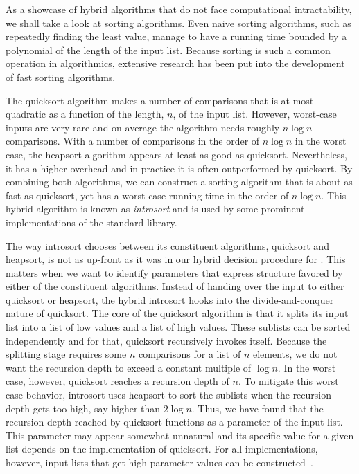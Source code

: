 \begin{example}
  As a showcase of hybrid algorithms that do not face computational intractability, we shall take a look at sorting algorithms.
  Even naive sorting algorithms, such as repeatedly finding the least value, manage to have a running time bounded by a polynomial of the length of the input list.
  Because sorting is such a common operation in algorithmics, extensive research has been put into the development of fast sorting algorithms.

  The quicksort algorithm \parencite{cormen2009introduction} makes a number of comparisons that is at most quadratic as a function of the length, $n$, of the input list.
  However, worst-case inputs are very rare and on average the algorithm needs roughly $n \log n$ comparisons.
  With a number of comparisons in the order of $n \log n$ in the worst case, the heapsort algorithm \parencite{cormen2009introduction} appears at least as good as quicksort.
  Nevertheless, it has a higher overhead and in practice it is often outperformed by quicksort.
  By combining both algorithms, we can construct a sorting algorithm that is about as fast as quicksort, yet has a worst-case running time in the order of $n \log n$.
  This hybrid algorithm is known as \emph{introsort} \parencite{musser1997introspective} and is used by some prominent implementations of the \Cpp{} standard library.

  The way introsort chooses between its constituent algorithms, quicksort and heapsort, is not as up-front as it was in our hybrid decision procedure for .
  This matters when we want to identify parameters that express structure favored by either of the constituent algorithms.
  Instead of handing over the input to either quicksort or heapsort, the hybrid introsort hooks into the divide-and-conquer nature of quicksort.
  The core of the quicksort algorithm is that it splits its input list into a list of low values and a list of high values.
  These sublists can be sorted independently and for that, quicksort recursively invokes itself.
  Because the splitting stage requires some $n$ comparisons for a list of $n$ elements, we do not want the recursion depth to exceed a constant multiple of $\log n$.
  In the worst case, however, quicksort reaches a recursion depth of $n$.
  To mitigate this worst case behavior, introsort uses heapsort to sort the sublists when the recursion depth gets too high, say higher than $2 \log n$.
  Thus, we have found that the recursion depth reached by quicksort functions as a parameter of the input list.
  This parameter may appear somewhat unnatural and its specific value for a given list depends on the implementation of quicksort.
  For all implementations, however, input lists that get high parameter values can be constructed~\parencite{mcilroy1999killer}.


\end{example}
